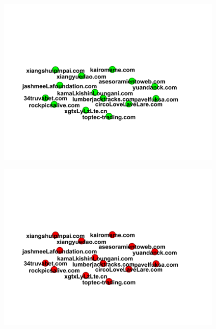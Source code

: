 \documentclass[conference]{IEEEtran}
\begin{document}
\begin{figure}[htbp]
 \centerline{\includegraphics[width=\columnwidth]{figs/07before.png}}
 \caption{}
\end{figure}

\begin{figure}[htbp]
 \centerline{\includegraphics[width=\columnwidth]{figs/07after.png}}
 \caption{}
\end{figure}
\end{document}
